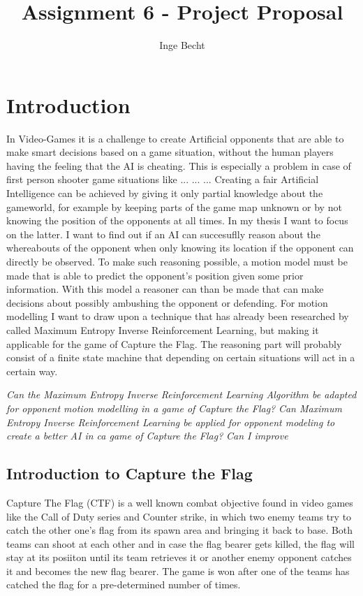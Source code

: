 \documentclass[a4paper, 12pt]{article}
\author{Inge Becht}
\title{Assignment 6 - Project Proposal}
\begin{document}
\maketitle

\section{Introduction}
In Video-Games it is a challenge to create Artificial opponents that are able to make smart
decisions based on a game situation, without the human players having the
feeling that
the AI is cheating. This is especially a problem in case of first person shooter
game situations like ... ... ... Creating a fair Artificial Intelligence can be achieved by
giving it only partial knowledge about the gameworld, for example by keeping parts of
the game map unknown or by not knowing the position of the opponents at all
times. In my thesis I want to focus on the latter. I want to find out if an AI
can succesuflly reason about the whereabouts of the opponent when only knowing
its location if the opponent can directly be observed. To make such reasoning
possible, a motion model must be made that is able to predict the opponent's position given some
prior information. With this model a reasoner can than be made that can make
decisions about possibly ambushing the opponent or defending. For motion modelling I
want to draw upon a technique that has already been researched by \citep{}
called Maximum Entropy Inverse Reinforcement Learning, but
making it applicable for the game of Capture the Flag. The reasoning part will
probably consist of a finite state machine that depending on certain situations
will act in a certain way.


\emph{Can the Maximum Entropy Inverse Reinforcement Learning Algorithm be
adapted for opponent motion modelling in a game of Capture the Flag?}
\emph{Can Maximum Entropy Inverse Reinforcement Learning be applied for
opponent modeling to create a better AI in ca game of Capture the Flag?}
\emph{Can I improve}

\subsection{Introduction to Capture the Flag}
Capture The Flag (CTF) is a well known combat objective found in video games
like the Call of Duty series and Counter strike, in which two enemy teams try to
catch the other one's flag from its spawn area and bringing it back to base.
Both teams can shoot at each other and in case the flag bearer gets killed, the
flag will stay at its posiiton until its team retrieves it or another enemy
opponent catches it and becomes the new flag bearer. The game is won after one
of the teams has catched the flag for a pre-determined number of times.
\end{document}
